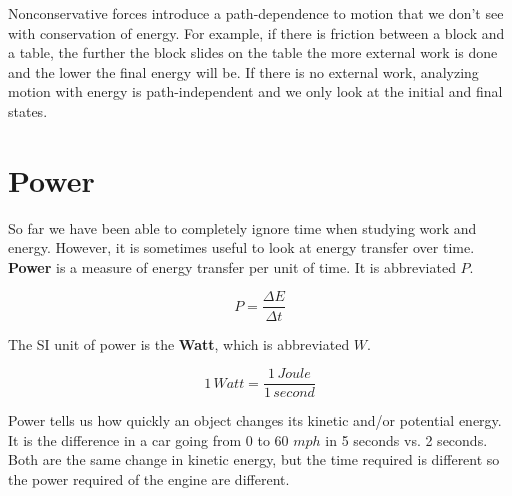 \documentclass[12pt]{book}
\begin{document}
Nonconservative forces introduce a path-dependence to motion that we don't see with conservation of energy. For example, if there is friction between a block and a table, the further the block slides on the table the more external work is done and the lower the final energy will be. If there is no external work, analyzing motion with energy is path-independent and we only look at the initial and final states.

\section{Power}

So far we have been able to completely ignore time when studying work and energy. However, it is sometimes useful to look at energy transfer over time. \textbf{Power} is a measure of energy transfer per unit of time. It is abbreviated $P$.

\begin{equation}
P = \frac{\Delta E}{\Delta t}
\label{power}
\end{equation}

 The SI unit of power is the \textbf{Watt}, which is abbreviated $W$.

\begin{equation}
1 \, Watt = \frac{1 \, Joule}{1 \, second}
\end{equation}

Power tells us how quickly an object changes its kinetic and/or potential energy. It is the difference in a car going from 0 to 60 $mph$ in 5 seconds vs. 2 seconds. Both are the same change in kinetic energy, but the time required is different so the power required of the engine are different.
\end{document}
